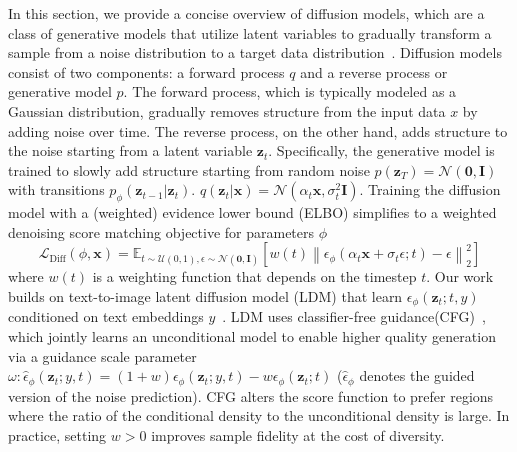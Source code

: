 \documentclass{article}
\begin{document}
In this section, we provide a concise overview of diffusion models, which are a class of generative models that utilize latent variables to gradually transform a sample from a noise distribution to a target data distribution~\cite{diffusion_models_dickstein_2015,ddpm_ho_2020}.
Diffusion models consist of two components: a forward process $q$ and a reverse process or generative model $p$. The forward process, which is typically modeled as a Gaussian distribution, gradually removes structure from the input data $x$ by adding noise over time. The reverse process, on the other hand, adds structure to the noise starting from a latent variable $\mathbf{z}_t$.
Specifically, the generative model is trained to slowly add structure starting from random noise $p(\mathbf{z}_T) = \mathcal{N}(\mathbf{0}, \mathbf{I})$ with transitions $p_{\phi}(\mathbf{z}_{t-1}|\mathbf{z}_{t})$.
$q(\mathbf{z}_t | \mathbf{x}) = \mathcal{N}(\alpha_t \mathbf{x}, \sigma^2_t \mathbf{I})$.
Training the diffusion model with a (weighted) evidence lower bound (ELBO) simplifies to a weighted denoising score matching objective for parameters $\phi$~\cite{ddpm_ho_2020}
\begin{equation}
\mathcal{L}_{\mathrm{Diff}}(\phi, \mathbf{x})=\mathbb{E}_{t \sim \mathcal{U}(0,1), \epsilon \sim \mathcal{N}(\mathbf{0}, \mathbf{I})}
\left[
w(t)\left\|\epsilon_{\phi}\left(\alpha_{t} \mathbf{x}+\sigma_{t} \epsilon ; t\right)-\epsilon\right\|_{2}^{2}
\right]
\end{equation}
where $w(t)$ is a weighting function that depends on the timestep $t$.
Our work builds on text-to-image latent diffusion model (LDM) that learn $\epsilon_{\phi}(\mathbf{z}_t;t,y)$ conditioned on text embeddings $y$~\cite{ldm_2022_Rombach}.
LDM uses classifier-free guidance(CFG)~\cite{classifierfree_2022_ho}, which jointly learns an unconditional model to enable higher quality generation via a guidance scale parameter $\omega: \hat{\epsilon}_{\phi} (\mathbf{z}_t;y,t) = (1+w) \epsilon_{\phi}(\mathbf{z}_t;y,t) - w\epsilon_{\phi}(\mathbf{z}_t;t)$ ($\hat{\epsilon}_{\phi}$ denotes the guided version of the noise prediction). CFG alters the score function to prefer regions where the ratio of the conditional density to the unconditional density is large. In practice, setting $w > 0$ improves sample fidelity at the cost of diversity.
\end{document}
